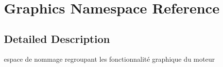 \hypertarget{namespace_graphics}{}\section{Graphics Namespace Reference}
\label{namespace_graphics}


\subsection{Detailed Description}
espace de nommage regroupant les fonctionnalité graphique du moteur 